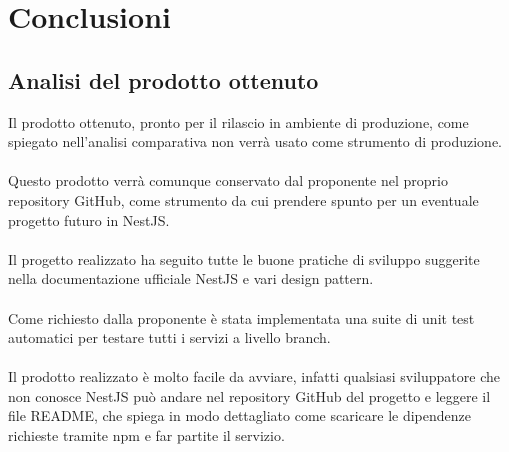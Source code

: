 
\chapter{Conclusioni}
\label{cap:conclusioni}

\section{Analisi del prodotto ottenuto}
Il prodotto ottenuto, pronto per il rilascio in ambiente di produzione, come spiegato nell'analisi
comparativa non verrà usato come strumento di produzione.
\\\\
Questo prodotto verrà comunque conservato dal proponente nel proprio repository GitHub, come strumento
da cui prendere spunto per un eventuale progetto futuro in NestJS.
\\\\
Il progetto realizzato ha seguito tutte le buone pratiche di sviluppo suggerite nella documentazione ufficiale
NestJS e vari design pattern.
\\\\
Come richiesto dalla proponente è stata implementata una suite di unit test automatici per testare tutti i servizi 
a livello branch.
\\\\
Il prodotto realizzato è molto facile da avviare, infatti qualsiasi sviluppatore che non conosce NestJS può andare 
nel repository GitHub del progetto e leggere il file README, che spiega in modo dettagliato come scaricare le 
dipendenze richieste tramite npm e far partite il servizio.


